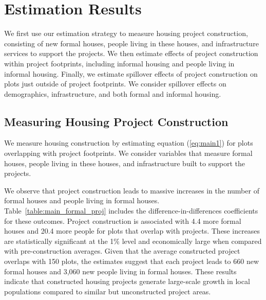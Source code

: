 \documentclass[12pt]{article}
\newcommand{\rv}{}
\begin{document}


\section{Estimation Results}\label{section:results}

\rv{We first use our estimation strategy to measure housing project construction, consisting of new formal houses, people living in these houses, and infrastructure services to support the projects.  We then estimate effects of project construction within project footprints, including informal housing and people living in informal housing.  Finally, we estimate spillover effects of project construction on plots just outside of project footprints.  We consider spillover effects on demographics, infrastructure, and both formal and informal housing.}

\subsection{Measuring Housing Project Construction}\label{section:measuringprojects}

\rv{We measure housing construction by estimating equation (\ref{eq:main1}) for plots overlapping with project footprints.  We consider variables that measure formal houses, people living in these houses, and infrastructure built to support the projects.  }

\rv{We observe that project construction leads to massive increases in the number of formal houses and people living in formal houses.  Table~\ref{table:main_formal_proj} includes the difference-in-differences coefficients for these outcomes.  Project construction is associated with 4.4 more formal houses and 20.4 more people for plots that overlap with projects.  These increases are statistically significant at the 1\% level and economically large when compared with pre-construction averages.  Given that the average constructed project overlaps with 150 plots, the estimates suggest that each project leads to 660 new formal houses and 3,060 new people living in formal houses.  These results indicate that constructed housing projects generate large-scale growth in local populations compared to similar but unconstructed project areas.}
\end{document}
